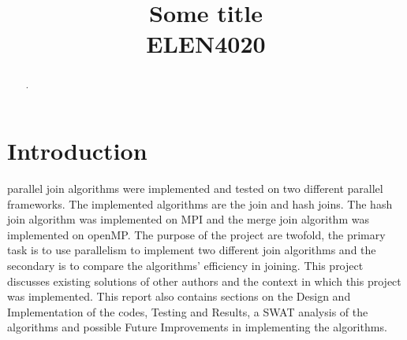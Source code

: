 \documentclass[conference, 11pt]{IEEEtran}
\begin{document}
\title{Some title\\
{\footnotesize \textsuperscript{}ELEN4020}
}

\author{
\and
{}

\and
{}

\and
{}


}

\maketitle

\begin{abstract}
.
\end{abstract}



\section{Introduction}

 parallel join algorithms were implemented and tested on two different parallel frameworks. The implemented algorithms are the join and hash joins. The hash join algorithm was implemented on MPI and the merge join algorithm was implemented on openMP. The purpose of the project are twofold, the primary task is to use parallelism to implement two different join algorithms and the secondary is to compare the algorithms' efficiency in joining. This project discusses existing solutions of other authors and the context in which this project was implemented. This report also contains sections on the Design and Implementation of the codes, Testing and Results, a SWAT analysis of the algorithms and possible Future Improvements in implementing the algorithms.
\end{document}
